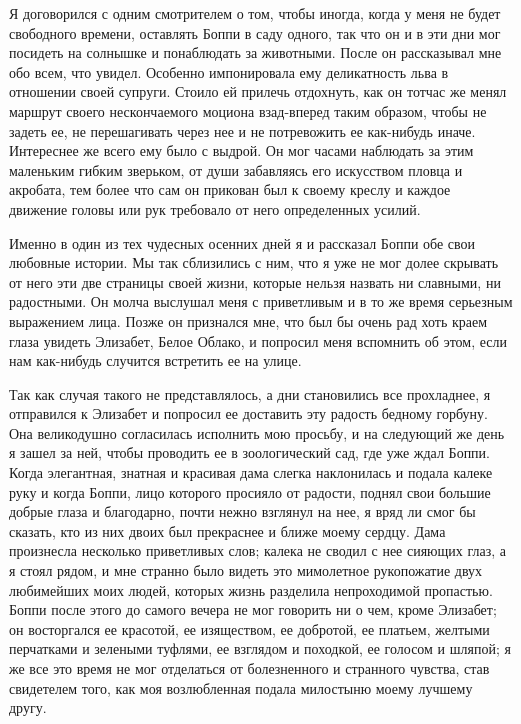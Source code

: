 Я договорился с одним смотрителем о том, чтобы иногда, когда у меня не
будет свободного времени, оставлять Боппи в  саду одного, так что он и
в эти дни  мог посидеть на солнышке и понаблюдать  за животными. После
он рассказывал  мне обо  всем, что  увидел. Особенно  импонировала ему
деликатность  льва  в  отношении  своей  супруги.  Стоило  ей  прилечь
отдохнуть, как он тотчас же менял маршрут своего нескончаемого моциона
взад-вперед таким образом,  чтобы не задеть ее,  не перешагивать через
нее и не потревожить ее как-нибудь иначе. Интереснее же всего ему было
с выдрой. Он  мог часами наблюдать за этим  маленьким гибким зверьком,
от души забавляясь его искусством пловца и акробата, тем более что сам
он  прикован был  к своему  креслу и  каждое движение  головы или  рук
требовало от него определенных усилий.

Именно в  один из тех  чудесных осенних дней  я и рассказал  Боппи обе
свои любовные истории. Мы так сблизились с ним, что я уже не мог долее
скрывать от него эти две  страницы своей жизни, которые нельзя назвать
ни славными, ни  радостными. Он молча выслушал меня с  приветливым и в
то же время серьезным выражением лица. Позже он признался мне, что был
бы  очень  рад  хоть  краем  глаза  увидеть  Элизабет,  Белое  Облако,
и  попросил  меня вспомнить  об  этом,  если нам  как-нибудь  случится
встретить ее на улице.

Так  как  случая  такого  не представлялось,  а  дни  становились  все
прохладнее,  я  отправился к  Элизабет  и  попросил ее  доставить  эту
радость  бедному горбуну.  Она великодушно  согласилась исполнить  мою
просьбу, и на следующий  же день я зашел за ней,  чтобы проводить ее в
зоологический сад,  где уже  ждал Боппи.  Когда элегантная,  знатная и
красивая дама слегка  наклонилась и подала калеке руку  и когда Боппи,
лицо которого просияло от радости,  поднял свои большие добрые глаза и
благодарно, почти  нежно взглянул на нее,  я вряд ли смог  бы сказать,
кто из них двоих был прекраснее  и ближе моему сердцу. Дама произнесла
несколько приветливых слов;  калека не сводил с нее сияющих  глаз, а я
стоял рядом, и мне странно было видеть это мимолетное рукопожатие двух
любимейших моих людей, которых жизнь разделила непроходимой пропастью.
Боппи после  этого до самого  вечера не мог  говорить ни о  чем, кроме
Элизабет;  он восторгался  ее  красотой, ее  изяществом, ее  добротой,
ее  платьем, желтыми  перчатками  и зелеными  туфлями,  ее взглядом  и
походкой, ее голосом и шляпой; я же все это время не мог отделаться от
болезненного  и  странного  чувства,  став свидетелем  того,  как  моя
возлюбленная подала милостыню моему лучшему другу.

